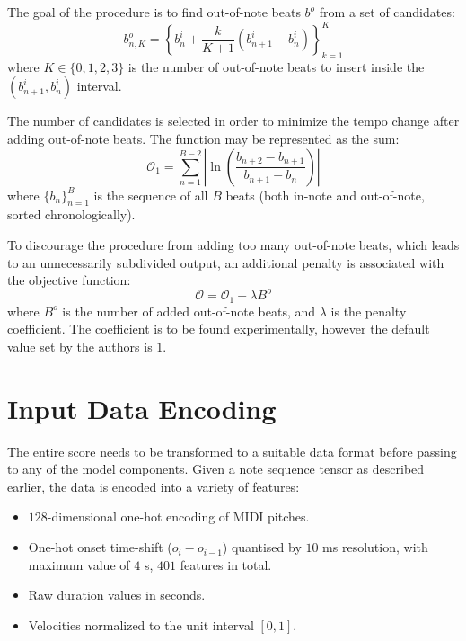 The goal of the procedure is to find out-of-note beats $b^o$ from a set of candidates: \begin{equation}\label{out_of_note_candidates}
b_{n,K}^o = \left\{b_n^i + \frac{k}{K+1}\left(b_{n+1}^i-b_n^i\right)\right\}_{k=1}^K
\end{equation} where $K\in\{0,1,2,3\}$ is the number of out-of-note beats to insert inside the $\left(b_{n+1}^i, b_n^i\right)$ interval.

The number of candidates is selected in order to minimize the tempo change after adding out-of-note beats. The function may be represented as the sum: \[\mathcal{O}_1 = \sum_{n=1}^{B-2}\left|\ln\left(\frac{b_{n+2} - b_{n+1}}{b_{n+1} - b_n}\right)\right|\] where $\{b_n\}_{n=1}^B$ is the sequence of all $B$ beats (both in-note and out-of-note, sorted chronologically).

To discourage the procedure from adding too many out-of-note beats, which leads to an unnecessarily subdivided output, an additional penalty is associated with the objective function: \begin{equation}\label{out_of_note_objective}
\mathcal{O} = \mathcal{O}_1 + \lambda B^o
\end{equation} where $B^o$ is the number of added out-of-note beats, and $\lambda$ is the penalty coefficient. The coefficient is to be found experimentally, however the default value set by the authors is $1$.



\section{Input Data Encoding}

The entire score needs to be transformed to a suitable data format before passing to any of the model components. Given a note sequence tensor as described earlier, the data is encoded into a variety of features: \begin{itemize}
	\item $128$-dimensional one-hot encoding of MIDI pitches.
	\item One-hot onset time-shift ($o_i - o_{i-1}$) quantised by $10$ ms resolution, with maximum value of $4$ s, $401$ features in total.
	\item Raw duration values in seconds.
	\item Velocities normalized to the unit interval $[0, 1]$.
\end{itemize}

